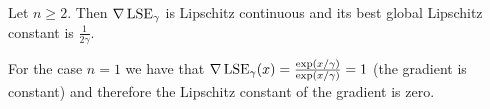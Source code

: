 \begin{corollary} \label{thm:LSE_Lipschitz_constant}
 Let \(n \geq 2\). Then \(\nabla \operatorname{LSE}_\gamma\) is Lipschitz continuous and its best global Lipschitz constant is \(\frac{1}{2 \gamma}\).
\end{corollary}


\begin{remark}
 For the case \(n = 1\) we have that \(\nabla \operatorname{LSE}_\gamma(x) = \frac{\exp(x/\gamma)}{\exp(x/\gamma)} = 1\) (the gradient is constant) 
 and therefore the Lipschitz constant of the gradient is zero.
\end{remark}
